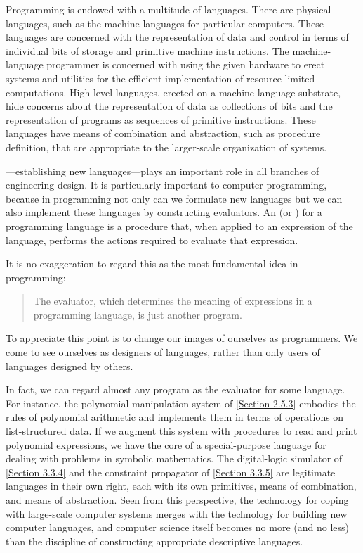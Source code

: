 Programming is endowed with a multitude of languages.
There are physical languages, such as the machine languages for particular computers.
These languages are concerned with the representation of data and control in terms of individual bits of storage and primitive machine instructions.
The machine-language programmer is concerned with using the given hardware to erect systems and utilities for the efficient implementation of resource-limited computations.
High-level languages, erected on a machine-language substrate, hide concerns about the representation of data as collections of bits and the representation of programs as sequences of primitive instructions.
These languages have means of combination and abstraction, such as procedure definition, that are appropriate to the larger-scale organization of systems.

---establishing new languages---plays an important role in all branches of engineering design.
It is particularly important to computer programming, because in programming not only can we formulate new languages but we can also implement these languages by constructing evaluators.
An  (or ) for a programming language is a procedure that, when applied to an expression of the language, performs the actions required to evaluate that expression.

It is no exaggeration to regard this as the most fundamental idea in programming:
\begin{quote}
	The evaluator, which determines the meaning of expressions in a programming language, is just another program.
\end{quote}
To appreciate this point is to change our images of ourselves as programmers.
We come to see ourselves as designers of languages, rather than only users of languages designed by others.

In fact, we can regard almost any program as the evaluator for some language.
For instance, the polynomial manipulation system of \cref{Section 2.5.3} embodies the rules of polynomial arithmetic and implements them in terms of operations on list-structured data.
If we augment this system with procedures to read and print polynomial expressions, we have the core of a special-purpose language for dealing with problems in symbolic mathematics.
The digital-logic simulator of \cref{Section 3.3.4} and the constraint propagator of \cref{Section 3.3.5} are legitimate languages in their own right, each with its own primitives, means of combination, and means of abstraction.
Seen from this perspective, the technology for coping with large-scale computer systems merges with the technology for building new computer languages, and computer science itself becomes no more (and no less) than the discipline of constructing appropriate descriptive languages.

